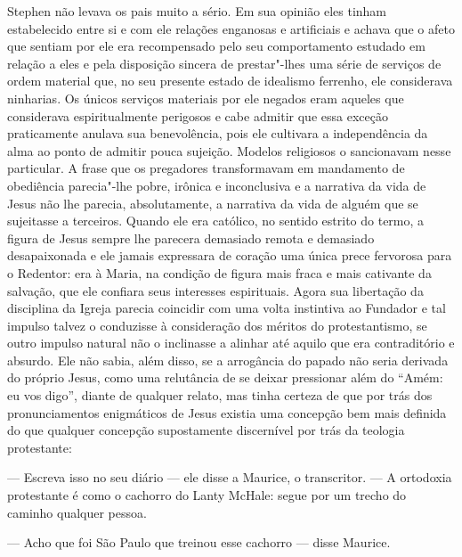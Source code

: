 Stephen não levava os pais muito a sério.  Em sua opinião eles tinham
estabelecido entre si e com ele relações enganosas e artificiais e achava que o
afeto que sentiam por ele era recompensado pelo seu comportamento estudado em
relação a eles e pela disposição sincera de prestar"-lhes uma série de serviços
de ordem material que, no seu presente estado de idealismo ferrenho, ele
considerava ninharias.  Os únicos serviços materiais por ele negados eram
aqueles que considerava espiritualmente perigosos e cabe admitir que essa
exceção praticamente anulava sua benevolência, pois ele cultivara a
independência da alma ao ponto de admitir pouca sujeição.  Modelos religiosos o
sancionavam nesse particular.  A frase que os pregadores transformavam em
mandamento de obediência parecia"-lhe pobre, irônica e inconclusiva e a
narrativa da vida de Jesus não lhe parecia, absolutamente, a narrativa da vida
de alguém que se sujeitasse a terceiros.  Quando ele era católico, no sentido
estrito do termo, a figura de Jesus sempre lhe parecera demasiado \label{remota"-e} remota e
demasiado desapaixonada e ele jamais expressara de coração uma única prece
fervorosa para o Redentor: era à Maria, na condição de \label{figura"-mais} figura mais fraca e
mais cativante da salvação, que ele confiara seus interesses espirituais.
Agora sua libertação da disciplina da Igreja parecia coincidir com uma volta
instintiva ao Fundador e tal impulso talvez o conduzisse à
consideração dos méritos do protestantismo, se outro impulso natural não o
inclinasse a alinhar até aquilo que era contraditório e absurdo.  Ele não
sabia, além disso, se a \label{arrogancia"-do} arrogância do papado não seria derivada do próprio
Jesus, como uma relutância de se deixar pressionar além do “Amém: eu vos
digo”, diante de qualquer relato, mas tinha certeza de que por trás dos
pronunciamentos enigmáticos de Jesus existia uma concepção bem mais definida do
que qualquer concepção supostamente discernível por trás da teologia
protestante:

--- Escreva isso no seu diário --- ele disse a Maurice, o transcritor.  --- A
ortodoxia protestante é como o cachorro do Lanty McHale: segue por um trecho do
caminho qualquer pessoa.

--- Acho que foi São Paulo que treinou esse cachorro --- disse Maurice.

